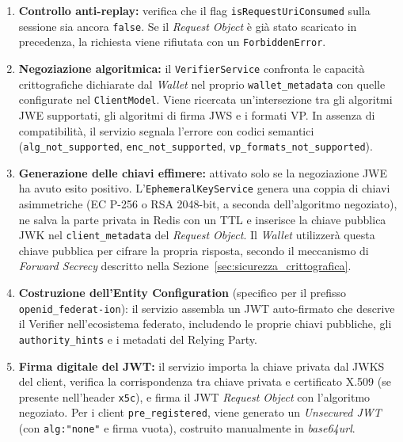 \begin{enumerate}
    \item \textbf{Controllo anti-replay:} verifica che il flag \texttt{isRequestUriConsumed} sulla sessione sia ancora \texttt{false}. Se il \textit{Request Object} è già stato scaricato in precedenza, la richiesta viene rifiutata con un \texttt{ForbiddenError}.

    \item \textbf{Negoziazione algoritmica:} il \texttt{VerifierService} confronta le capacità crittografiche dichiarate dal \textit{Wallet} nel proprio \texttt{wallet\_\allowbreak{}metadata} con quelle configurate nel \texttt{ClientModel}. Viene ricercata un'intersezione tra gli algoritmi JWE supportati, gli algoritmi di firma JWS e i formati VP. In assenza di compatibilità, il servizio segnala l'errore con codici semantici (\texttt{alg\_\allowbreak{}not\_\allowbreak{}supported}, \texttt{enc\_\allowbreak{}not\_\allowbreak{}supported}, \texttt{vp\_\allowbreak{}formats\_\allowbreak{}not\_\allowbreak{}supported}).

    \item \textbf{Generazione delle chiavi effimere:} attivato solo se la negoziazione JWE ha avuto esito positivo. L'\texttt{EphemeralKeyService} genera una coppia di chiavi asimmetriche (EC P-256 o RSA 2048-bit, a seconda dell'algoritmo negoziato), ne salva la parte privata in Redis con un TTL e inserisce la chiave pubblica JWK nel \texttt{client\_\allowbreak{}metadata} del \textit{Request Object}. Il \textit{Wallet} utilizzerà questa chiave pubblica per cifrare la propria risposta, secondo il meccanismo di \textit{Forward Secrecy} descritto nella Sezione~\ref{sec:sicurezza_crittografica}.

    \item \textbf{Costruzione dell'Entity Configuration} (specifico per il prefisso \texttt{openid\_\allowbreak{}federat-\allowbreak{}ion}): il servizio assembla un JWT auto-firmato che descrive il Verifier nell'ecosistema federato, includendo le proprie chiavi pubbliche, gli \texttt{authority\_\allowbreak{}hints} e i metadati del Relying Party.

    \item \textbf{Firma digitale del JWT:} il servizio importa la chiave privata dal JWKS del client, verifica la corrispondenza tra chiave privata e certificato X.509 (se presente nell'header \texttt{x5c}), e firma il JWT \textit{Request Object} con l'algoritmo negoziato. Per i client \texttt{pre\_\allowbreak{}registered}, viene generato un \textit{Unsecured JWT} (con \texttt{alg:"none"} e firma vuota), costruito manualmente in \textit{base64url}.
\end{enumerate}


